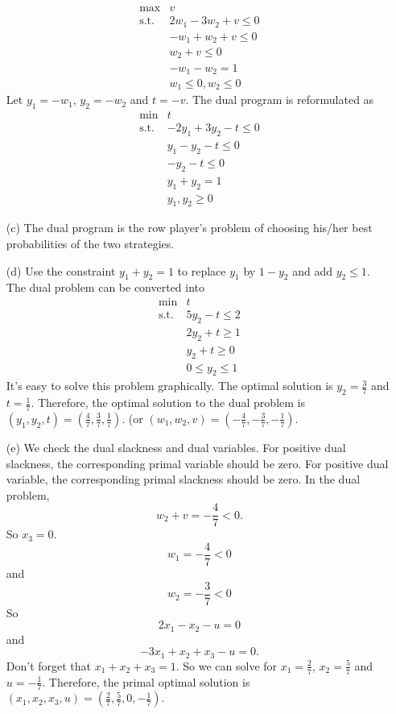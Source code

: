 \documentclass[12pt]{article}
\begin{document}
\begin{itemize}
	\begin{equation*}
	\begin{array}{rl}
	\max & v \\
	\text{s.t.} & 2w_1 - 3w_2 + v \leq 0 \\
	& -w_1 + w_2 + v \leq 0 \\
	& w_2 + v \leq 0 \\
	& -w_1 - w_2 = 1 \\
	& w_1 \leq 0, w_2 \leq 0
	\end{array}
	\end{equation*}
	Let $y_1 = -w_1$, $y_2 = -w_2$ and $t=-v$. The dual program is reformulated as
	\begin{equation*}
	\begin{array}{rl}
	\min & t \\
	\text{s.t.} & -2y_1 + 3y_2 -t \leq 0 \\
	& y_1 -y_2 -t \leq 0 \\
	& -y_2 - t \leq 0 \\
	& y_1 + y_2 = 1 \\
	& y_1, y_2 \geq 0
	\end{array}
	\end{equation*}
	\item[(c)] The dual program is the row player's problem of choosing his/her best probabilities of the two strategies.
	\item[(d)] Use the constraint $y_1+y_2=1$ to replace $y_1$ by $1-y_2$ and add $y_2\leq 1$. The dual problem can be converted into
	\begin{equation*}
	\begin{array}{rl}
	\min & t \\
	\text{s.t.} & 5y_2 - t\leq 2 \\
	& 2y_2 + t \geq 1 \\
	& y_2 + t \geq 0 \\
	& 0\leq y_2 \leq 1
	\end{array}
	\end{equation*}
	It's easy to solve this problem graphically. The optimal solution is $y_2 = \frac{3}{7}$ and $t=\frac{1}{7}$. Therefore, the optimal solution to the dual problem is $(y_1,y_2,t)=(\frac{4}{7},\frac{3}{7},\frac{1}{7})$. (or $(w_1,w_2,v)=(-\frac{4}{7},-\frac{3}{7},-\frac{1}{7})$.
	
	\item[(e)] We check the dual slackness and dual variables. For positive dual slackness, the corresponding primal variable should be zero. For positive dual variable, the corresponding primal slackness should be zero. In the dual problem,
	\[w_2 + v = -\frac{4}{7} <0.\]
	So $x_3 = 0$.
	\[w_1 =-\frac{4}{7}< 0\]
	and \[w_2 =-\frac{3}{7}< 0\]
	So \[2x_1-x_2-u=0\]
	and \[-3x_1+x_2+x_3-u=0.\]
	Don't forget that $x_1+x_2+x_3=1$. So we can solve for $x_1=\frac{2}{7}$, $x_2=\frac{5}{7}$ and $u=-\frac{1}{7}$. Therefore, the primal optimal solution is $(x_1,x_2,x_3,u)=(\frac{2}{7},\frac{5}{7},0,-\frac{1}{7})$.
	

\end{itemize}
\end{document}
